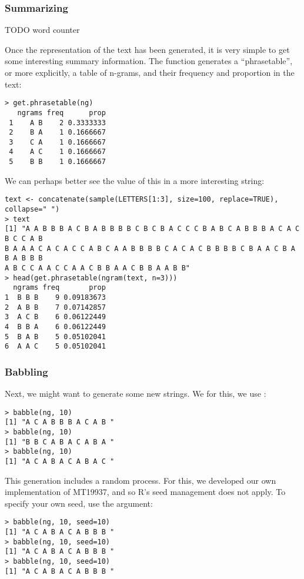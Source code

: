 \subsubsection{Summarizing}

TODO word counter

Once the  representation of the text has been generated, it is very 
simple to get some interesting summary information.  The function 
 generates a ``phrasetable'', or more explicitly, a 
table of n-grams, and their frequency and proportion in the text:

\begin{lstlisting}[language=inteRactive]
> get.phrasetable(ng)
   ngrams freq      prop
 1    A B    2 0.3333333
 2    B A    1 0.1666667
 3    C A    1 0.1666667
 4    A C    1 0.1666667
 5    B B    1 0.1666667
\end{lstlisting}


We can perhaps better see the value of this in a more interesting string:

\begin{lstlisting}[language=inteRactive]
text <- concatenate(sample(LETTERS[1:3], size=100, replace=TRUE), collapse=" ")
> text
[1] "A A B B B A C B A B B B B C B C B A C C C B A B C A B B B A C A C B C C A B 
B A A A C A C A C C A B C A A B B B B C A C A C B B B B C B A A C B A B A B B B 
A B C C A A C C A A C B B A A C B B A A B B"
> head(get.phrasetable(ngram(text, n=3)))
  ngrams freq       prop
1  B B B    9 0.09183673
2  A B B    7 0.07142857
3  A C B    6 0.06122449
4  B B A    6 0.06122449
5  B A B    5 0.05102041
6  A A C    5 0.05102041
\end{lstlisting}



\subsubsection{Babbling}

Next, we might want to generate some new strings.  We for this, we use 
:

\begin{lstlisting}[language=inteRactive]
> babble(ng, 10)
[1] "A C A B B B A C A B "
> babble(ng, 10)
[1] "B B C A B A C A B A "
> babble(ng, 10)
[1] "A C A B A C A B A C "
\end{lstlisting}

This generation includes a random process.  For this, we developed our own 
implementation of MT19937, and so R's seed management does not apply.  To 
specify your own seed, use the  argument:
\begin{lstlisting}[language=inteRactive]
> babble(ng, 10, seed=10)
[1] "A C A B A C A B B B "
> babble(ng, 10, seed=10)
[1] "A C A B A C A B B B "
> babble(ng, 10, seed=10)
[1] "A C A B A C A B B B "
\end{lstlisting}




